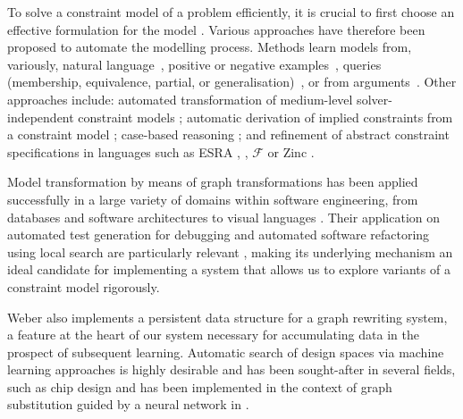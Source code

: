 \documentclass[runningheads]{llncs}
\begin{document}
To solve a constraint model of a problem efficiently, it is crucial to first choose an effective formulation for the model \cite{freuder2018:progress}.
Various approaches have therefore been proposed to automate the modelling process.
Methods learn models from, variously,
natural language~\cite{Kiziltan2016:constraint},
positive or negative examples~\cite{DeRaedt2018:learning,Bessiere2017:constraint,Arcangioli2016:multiple},
queries (membership, equivalence, partial, or generalisation)~\cite{Beldiceanu2012:model,Bessiere2013:constraint,Bessiere2014:boosting}, or
from arguments~\cite{Shchekotykhin2009:argumentation}.
Other approaches include:
automated transformation of medium-level solver-independent constraint models \cite{Rendl2010:thesis,Nethercote2007:minizinc,OPLBook,Mills1999:eacl,Nightingale2014:automatically,savilerow,Nightingale2015:automatically};
automatic derivation of implied constraints from a constraint model \cite{frisch2003:cgrass,colton2001:constraint,charnley2006:automatic,Bessiere2007:learning,Leo2013:globalizing};
case-based reasoning \cite{Little2003:using}; and
refinement of abstract constraint specifications \cite{Frisch2005:rules} in languages such as ESRA \cite{Flener2003:esra}, \essence \cite{frisch2008:essence}, ${\mathcal F}$ \cite{Hnich2003:function} or Zinc \cite{marriott2008:design,ZincModref10,Rafeh2016:linzinc}.

Model transformation by means of graph transformations \cite{mens2005use} has been applied successfully in a large variety of domains within software engineering, from databases and software architectures to visual languages \cite{kahani2019survey,taentzer2005model}.
Their application on automated test generation for debugging \cite{troya2022model} and automated software refactoring using local search are particularly relevant \cite{qayum2009local},
making its underlying mechanism an ideal candidate for implementing a system that allows us to explore variants of a constraint model rigorously.

Weber \cite{weber2022tool} also implements a persistent data structure for a graph rewriting system, a feature at the heart of our system necessary for accumulating data in the prospect of subsequent learning. Automatic search of design spaces via machine learning approaches is highly desirable and has been sought-after in several fields, such as chip design \cite{hu2020machine} and has been implemented in the context of graph substitution guided by a neural network in \cite{jia2019taso}.
\end{document}
